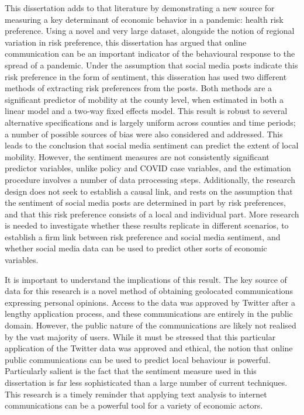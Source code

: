 \documentclass{article}
\begin{document}
This dissertation adds to that literature by demonstrating a new source for measuring a key determinant of economic behavior in a pandemic: health risk preference. Using a novel and very large dataset, alongside the notion of regional variation in risk preference, this dissertation has argued that online communication can be an important indicator of the behavioural response to the spread of a pandemic. Under the assumption that social media posts indicate this risk preference in the form of sentiment, this disseration has used two different methods of extracting risk preferences from the posts. Both methods are a significant predictor of mobility at the county level, when estimated in both a linear model and a two-way fixed effects model. This result is robust to several alternative specifications and is largely uniform across counties and time periods; a number of possible sources of bias were also considered and addressed. This leads to the conclusion that social media sentiment can predict the extent of local mobility. However, the sentiment measures are not consistently significant predictor variables, unlike policy and COVID case variables, and the estimation procedure involves a number of data prrocessing steps. Additionally, the research design does not seek to establish a causal link, and rests on the assumption that the sentiment of social media posts are determined in part by risk preferences, and that this risk preference consists of a local and individual part. More research is needed to investigate whether these results replicate in different scenarios, to establish a firm link between risk preference and social media sentiment, and whether social media data can  be used to predict other sorts of economic variables. 

It is important to understand the implications of this result. The key source of data for this research is a novel method of obtaining geolocated communications expressing personal opinions. Access to the data was approved by Twitter after a lengthy application process, and these communications are entirely in the public domain. However, the public nature of the communications are likely not realised by the vast majority of users. While it must be stressed that this particular application of the Twitter data was approved and ethical, the notion that online public communications can be used to predict local behaviour is powerful. Particularly salient is the fact that the sentiment measure used in this dissertation is far less sophisticated than a large number of current techniques. This research is a timely reminder that applying text analysis to internet communications can be a powerful tool for a variety of economic actors.
\printbibliography
\end{document}
